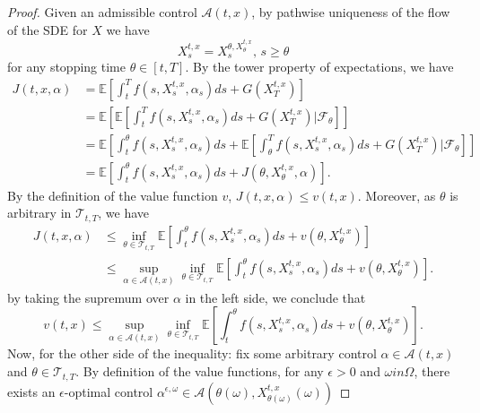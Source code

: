 \begin{proof}
    Given an admissible control $\mathcal{A}(t,x)$, by pathwise uniqueness of the flow of the SDE for $X$ we have
    \begin{equation}
        X_s^{t,x} =  X_s^{\theta, X_\theta^{t,x}}, \, s \geq \theta
    \end{equation}
    for any stopping time $\theta \in [t,T]$. By the tower property of expectations, 
    we have
    \begin{align*}
        J(t,x,\alpha) &= \mathbb{E}\left[ \int_t^T f(s, X_s^{t,x}, \alpha_s) ds + G(X_T^{t,x})  \right] \\
        &= \mathbb{E}\left[ \mathbb{E} \left[ \int_t^Tf(s, X_s^{t,x}, \alpha_s) ds + G(X_T^{t,x}) | \mathcal{F}_\theta \right] \right] \\
        &= \mathbb{E}\left[  \int_t^\theta f(s,X_s^{t,x}, \alpha_s) ds +  \mathbb{E} \left[ \int_\theta^T f(s, X_s^{t,x}, \alpha_s) ds + G(X_T^{t,x}) | \mathcal{F}_\theta \right] \right]\\ 
        &= \mathbb{E}\left[  \int_t^\theta f(s,X_s^{t,x}, \alpha_s) ds +  J(\theta, X_\theta^{t,x}, \alpha) \right].
    \end{align*}
    By the definition of the value function $v$, $J(t,x,\alpha) \leq v(t,x)$.
    Moreover, as $\theta$ is arbitrary in $\mathcal{T}_{t,T}$, we have
    \begin{align*}
        J(t,x,\alpha) &\leq \inf_{\theta \in \mathcal{T}_{t,T}} \mathbb{E}\left[ \int_t^\theta f(s, X_s^{t,x}, \alpha_s) ds  + v(\theta, X_\theta^{t,x})\right] \\
        & \leq \sup_{\alpha \in \mathcal{A}(t,x)} \inf_{\theta \in \mathcal{T}_{t,T}} \mathbb{E}\left[ \int_t^\theta f(s,X^{t,x}_s, \alpha_s) ds + v(\theta, X_\theta^{t,x}) \right]. 
    \end{align*}
    by taking the supremum over $\alpha$ in the left side, we conclude that
    \begin{equation}
        v(t,x)  \leq \sup_{\alpha \in \mathcal{A}(t,x)} \inf_{\theta \in \mathcal{T}_{t,T}} \mathbb{E}\left[ \int_t^\theta f(s,X^{t,x}_s, \alpha_s) ds + v(\theta, X_\theta^{t,x}) \right]. 
    \end{equation}
    Now, for the other side of the inequality: fix some arbitrary control
    $\alpha \in \mathcal{A}(t,x)$ and $\theta \in \mathcal{T}_{t,T}$.
    By definition of the value functions, for any $\epsilon > 0$ and 
    $\omega in \Omega$, there exists an $\epsilon$-optimal control
    $\alpha^{\epsilon, \omega} \in \mathcal{A}( \theta(\omega), X^{t,x}_{\theta(\omega)} (\omega)  )$

\end{proof}
